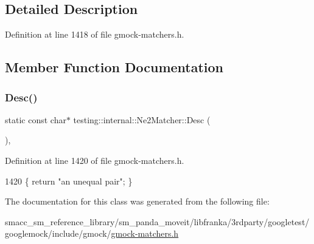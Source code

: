 \subsection{Detailed Description}


Definition at line 1418 of file gmock-\/matchers.\+h.



\subsection{Member Function Documentation}
\mbox{\label{classtesting_1_1internal_1_1Ne2Matcher_a4a387f6ef1d20caf53911ef91c0f39f1}} 
\subsubsection{\texorpdfstring{Desc()}{Desc()}}
{\footnotesize\ttfamily static const char$\ast$ testing\+::internal\+::\+Ne2\+Matcher\+::\+Desc (\begin{DoxyParamCaption}{ }\end{DoxyParamCaption})\hspace{0.3cm}{\ttfamily [inline]}, {\ttfamily [static]}}



Definition at line 1420 of file gmock-\/matchers.\+h.


\begin{DoxyCode}
1420 \{ \textcolor{keywordflow}{return} \textcolor{stringliteral}{"an unequal pair"}; \}
\end{DoxyCode}


The documentation for this class was generated from the following file\+:\begin{DoxyCompactItemize}
\item 
smacc\+\_\+sm\+\_\+reference\+\_\+library/sm\+\_\+panda\+\_\+moveit/libfranka/3rdparty/googletest/googlemock/include/gmock/\hyperlink{gmock-matchers_8h}{gmock-\/matchers.\+h}\end{DoxyCompactItemize}
